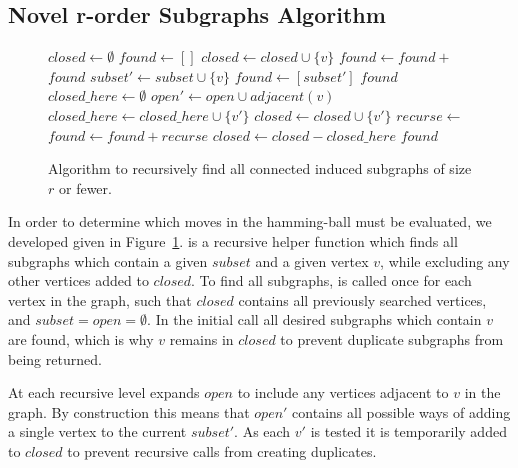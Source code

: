 \documentclass{sig-alternate}
\begin{document}
\subsection{Novel r-order Subgraphs Algorithm}
\begin{figure}
  \begin{algorithmic}[1]
    \State $closed \leftarrow \emptyset$
    \State $found \leftarrow []$
      \State $closed \leftarrow closed \cup \{v\}$
      \State $found \leftarrow found + $
    \EndFor
    \State \Return $found$
  \EndProcedure
    \State $subset' \leftarrow subset \cup \{v\}$
    \State $found \leftarrow [subset']$
      \Return $found$
    \EndIf
    \State $closed\_here \leftarrow \emptyset$
    \State $open' \leftarrow open \cup adjacent(v)$
        \State $closed\_here \leftarrow closed\_here \cup \{v'\}$
        \State $closed \leftarrow closed \cup \{v'\}$
        \State $recurse \leftarrow $
        \State $found \leftarrow found + recurse$
    \EndFor
    \State $closed \leftarrow closed - closed\_here$
    \State \Return $found$
  \EndProcedure
\end{algorithmic}
  \caption{Algorithm to recursively find all connected induced subgraphs of size $r$ or fewer.}
  \label{fig-connected-subgraphs}
\end{figure}

In order to determine which moves in the hamming-ball must be evaluated,
we developed  given in Figure~\ref{fig-connected-subgraphs}.
 is a recursive helper function which finds all subgraphs
which contain a given $subset$ and a given vertex $v$, while excluding
any other vertices added to $closed$. To find all subgraphs, 
is called once for each vertex in the graph, such that $closed$ contains
all previously searched vertices, and $subset=open=\emptyset$. In the initial
call all desired subgraphs which contain $v$ are found, which is why $v$ remains
in $closed$ to prevent duplicate subgraphs from being returned.

At each recursive level  expands $open$ to include any vertices
adjacent to $v$ in the graph. By construction this means that $open'$ contains
all possible ways of adding a single vertex to the current $subset'$. As each $v'$
is tested it is temporarily added to $closed$ to prevent recursive calls
from creating duplicates.
\end{document}
